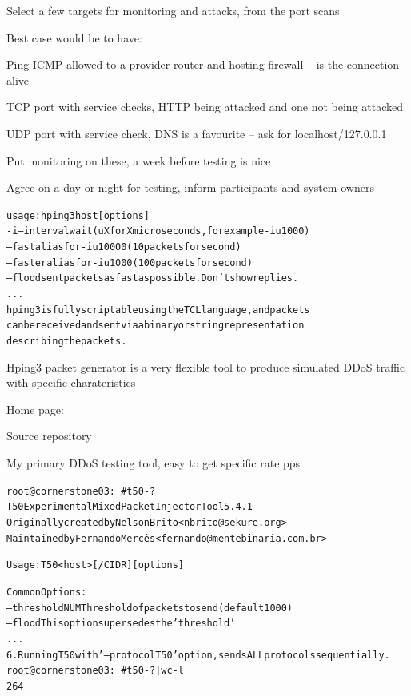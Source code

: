 \documentclass[Screen16to9,17pt]{foils}
\begin{document}

Select a few targets for monitoring and attacks, from the port scans

Best case would be to have:
\begin{list2}
\item Ping ICMP allowed to a provider router and hosting firewall -- is the connection alive
\item TCP port with service checks, HTTP being attacked and one not being attacked
\item UDP port with service check, DNS is a favourite -- ask for localhost/127.0.0.1
\item Put monitoring on these, a week before testing is nice
\item Agree on a day or night for testing, inform participants and system owners
\end{list2}



\begin{alltt}\footnotesize
usage: hping3 host [options]
  -i  --interval  wait (uX for X microseconds, for example -i u1000)
      --fast      alias for -i u10000 (10 packets for second)
      --faster    alias for -i u1000 (100 packets for second)
      --flood	   sent packets as fast as possible. Don't show replies.
...
hping3 is fully scriptable using the TCL language, and packets
can be received and sent via a binary or string representation
describing the packets.
\end{alltt}

\begin{list2}
\item Hping3 packet generator is a very flexible tool to produce simulated DDoS traffic with specific charateristics
\item Home page: 
\item Source repository 
\end{list2}

\centerline{My primary DDoS testing tool, easy to get specific rate pps}




\begin{alltt}\footnotesize
root@cornerstone03:~# t50 -?
T50 Experimental Mixed Packet Injector Tool 5.4.1
Originally created by Nelson Brito <nbrito@sekure.org>
Maintained by Fernando Mercês <fernando@mentebinaria.com.br>

Usage: T50 <host> [/CIDR] [options]

Common Options:
    --threshold NUM        Threshold of packets to send     (default 1000)
    --flood                This option supersedes the 'threshold'
...
6. Running T50 with '--protocol T50' option, sends ALL protocols sequentially.
root@cornerstone03:~# t50 -? | wc -l
264
\end{alltt}
\end{document}
